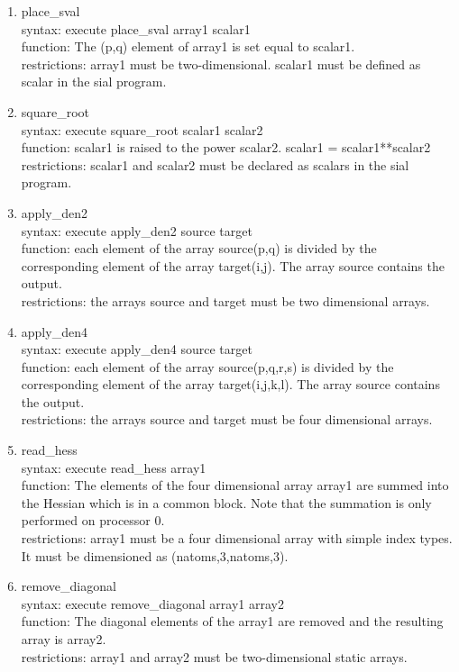 \documentclass[12pt]{article}
\begin{document}
\begin{enumerate}
\item place\_sval\\ 
syntax: execute place\_sval array1 scalar1\\ 
function: The (p,q) element of array1 is set equal to scalar1.\\ 
restrictions: array1 must be two-dimensional. scalar1 must be defined as scalar in the 
sial program.

\item square\_root\\ 
syntax: execute square\_root scalar1 scalar2\\ 
function: scalar1 is raised to the power scalar2. scalar1 = scalar1**scalar2\\ 
restrictions: scalar1 and scalar2 must be declared as scalars in the sial program.

\item apply\_den2\\ 
syntax: execute apply\_den2 source target\\ 
function: each element of the array source(p,q) is divided by the corresponding element 
of the array target(i,j). The array source contains the output.\\ 
restrictions: the arrays source and target must be two dimensional arrays.

\item apply\_den4\\ 
syntax: execute apply\_den4 source target\\ 
function: each element of the array source(p,q,r,s) is divided by the corresponding 
element of the array target(i,j,k,l). The array source contains the output.\\ 
restrictions: the arrays source and target must be four dimensional arrays.

\item read\_hess\\ 
syntax: execute read\_hess array1\\ 
function: The elements of the four dimensional array array1 are summed into the Hessian 
which is in a common block. Note that the summation is only performed on processor 0.\\ 
restrictions: array1 must be a four dimensional array with simple index types. It must be 
dimensioned as (natoms,3,natoms,3).

\item remove\_diagonal\\ 
syntax: execute remove\_diagonal array1 array2\\ 
function: The diagonal elements of the array1 are removed and the resulting array is array2.\\ 
restrictions: array1 and array2 must be two-dimensional static arrays.


\end{enumerate}
\end{document}
